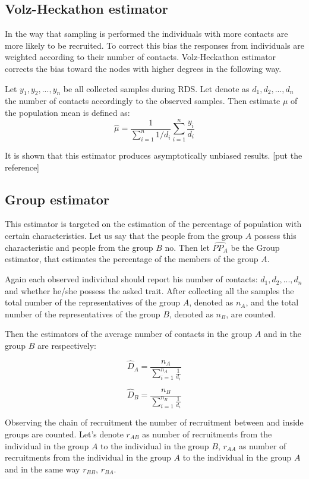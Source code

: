 \documentclass[12pt]{report}
\begin{document}
 
\subsection{Volz-Heckathon estimator}

In the way that sampling is performed the individuals with more contacts are more likely to be recruited. To correct this bias the responses from individuals are weighted according to their number of contacts. Volz-Heckathon estimator corrects the bias toward the nodes with higher degrees in the following way.

Let $y_1, y_2, ..., y_n$ be all collected samples during RDS. Let denote as $d_1, d_2, ..., d_n$ the number of contacts accordingly to the observed samples.
Then estimate $\mu$ of the population mean is defined as:
$$ \hat{\mu} = \frac{1}{\sum\limits_{i=1}^n 1/d_i} \sum\limits_{i=1}^n \frac{y_i}{d_i}$$

It is shown that this estimator produces asymptotically unbiased results. [put the reference]

\subsection{Group estimator}

This estimator is targeted on the estimation of the percentage of population with certain characteristics. Let us say that the people from the group $A$ possess this characteristic and people from the group $B$ no. Then let $\widehat{PP_A}$ be the Group estimator, that estimates the percentage of the members of the group $A$.

Again each observed individual should report his number of contacts: $d_1, d_2, ..., d_n$ and whether he/she possess the asked trait. After collecting all the samples the total number of the representatives of the group $A$, denoted as $n_A$, and the total number of the representatives of the group $B$, denoted as $n_B$, are counted. 

Then the estimators of the average number of contacts in the group $A$ and in the group $B$ are respectively:

$$ \widehat{D}_A = \frac{n_A}{ \sum_{i=1}^{n_A} \frac{1}{d_i}} $$

$$ \widehat{D}_B = \frac{n_B}{ \sum_{i=1}^{n_B} \frac{1}{d_i}} $$

Observing the chain of recruitment the number of recruitment between and inside groups are counted. Let's denote $r_{AB}$ as number of recruitments from the individual in the group $A$ to the individual in the group $B$, $r_{AA}$ as number of recruitments from the individual in the group $A$ to the individual in the group $A$ and in the same way $r_{BB}$, $r_{BA}$.
\end{document}
